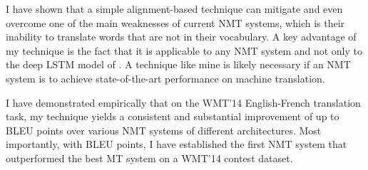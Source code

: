 I have shown that a simple alignment-based technique can mitigate and even
overcome one of the main weaknesses of current NMT systems, which is
their inability to translate words that are not in their vocabulary.  
A key advantage of my technique is the fact that it is applicable to any NMT system and not
only to the deep LSTM model of .  A technique
like mine is likely necessary if an NMT system is to achieve state-of-the-art performance
on machine translation.

I have demonstrated empirically that on the WMT'14 English-French translation task, my technique yields a 
consistent and substantial improvement of up to \bestunkimp{} BLEU points over various NMT systems of different architectures. 
Most importantly, with \bestbleuunk{} BLEU points, I have established the first NMT system that outperformed 
the best MT system on a WMT'14 contest dataset.


